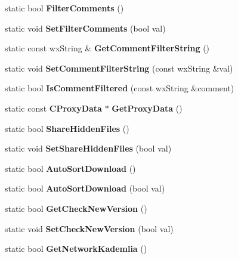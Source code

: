 \begin{DoxyCompactItemize}
\item 
static bool {\bfseries FilterComments} ()\label{classCPreferences_ab5a0e775f72fdb1533e645cd6c2c214a}

\item 
static void {\bfseries SetFilterComments} (bool val)\label{classCPreferences_a1c0fa210f9b563dbf412e2eda736ab6d}

\item 
static const wxString \& {\bfseries GetCommentFilterString} ()\label{classCPreferences_aab04d646fc53f1eb05b7d20ee622b7df}

\item 
static void {\bfseries SetCommentFilterString} (const wxString \&val)\label{classCPreferences_a91d7bef667918b4eba3e75cbd59ded2c}

\item 
static bool {\bfseries IsCommentFiltered} (const wxString \&comment)\label{classCPreferences_ab8a4b22378a6e1ef2a287dc47a135ece}

\item 
static const {\bf CProxyData} $\ast$ {\bfseries GetProxyData} ()\label{classCPreferences_a8d034229916c5f8cad3e5e094df3d337}

\item 
static bool {\bfseries ShareHiddenFiles} ()\label{classCPreferences_aafa38f516c0a2af4ab0bc32df03bdbfb}

\item 
static void {\bfseries SetShareHiddenFiles} (bool val)\label{classCPreferences_ad7da7bbcce6bdb1f4aefdcacd5c387b6}

\item 
static bool {\bfseries AutoSortDownload} ()\label{classCPreferences_a7fd1caed1bc9bbd33bbb0e93a67724f5}

\item 
static bool {\bfseries AutoSortDownload} (bool val)\label{classCPreferences_ad7f9fbaec76f15ce5ee6c2ca39f45e0e}

\item 
static bool {\bfseries GetCheckNewVersion} ()\label{classCPreferences_a537f232aa99dcd7c1ff41c9fd4079852}

\item 
static void {\bfseries SetCheckNewVersion} (bool val)\label{classCPreferences_a4848f1359ab71fb7fea8e202d30861ea}

\item 
static bool {\bfseries GetNetworkKademlia} ()\label{classCPreferences_a5eab9125c61f03551dca1265ef442261}


\end{DoxyCompactItemize}
